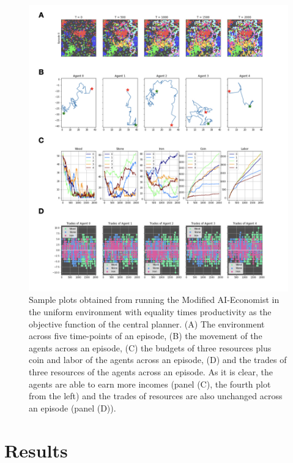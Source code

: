 \documentclass{article}
\begin{document}
\begin{figure}
	\centering
    \includegraphics[width=0.7\linewidth]{"A_Multi-agent_Reinforcement_Learning_Study_of_Emergence_of_Social_Classes_out_of_Arbitrary_Governance_The_Role_of_Environment_Slides_2/A_Multi-agent_Reinforcement_Learning_Study_of_Emergence_of_Social_Classes_out_of_Arbitrary_Governance_The_Role_of_Environment_Slides_2.002"}
    \caption{Sample plots obtained from running the Modified AI-Economist in the uniform environment with equality times productivity as the objective function of the central planner. (A) The environment across five time-points of an episode, (B) the movement of the agents across an episode, (C) the budgets of three resources plus coin and labor of the agents across an episode, (D) and the trades of three resources of the agents across an episode. As it is clear, the agents are able to earn more incomes (panel (C), the fourth plot from the left) and the trades of resources are also unchanged across an episode (panel (D)).}
    \label{Figure3}
\end{figure}

\section{Results}
\end{document}
